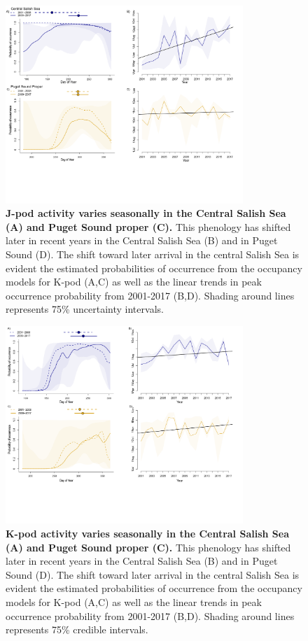 \documentclass{article}
\begin{document}
\begin{figure}[!hp]
\includegraphics[width=0.8\textwidth]{../analyses/figures/proboccJ_4panels.png} 
\caption{\textbf{J-pod activity varies seasonally in the Central Salish Sea (A) and Puget Sound proper (C).} This phenology has shifted later in recent years in the Central Salish Sea (B) and in Puget Sound (D). The shift toward later arrival in the central Salish Sea is evident the estimated probabilities of occurrence from the occupancy models for K-pod (A,C) as well as the linear trends in peak occurrence probability from 2001-2017 (B,D). Shading around lines represents 75\% uncertainty intervals. 
}
\label{fig:Jprobs}
\end{figure}

\begin{figure}[!hp]
\includegraphics[width=0.8\textwidth]{../analyses/figures/proboccK_4panels.png} 
\caption{\textbf{K-pod activity varies seasonally in the Central Salish Sea (A) and Puget Sound proper (C).} This phenology has shifted later in recent years in the Central Salish Sea (B) and in Puget Sound (D). The shift toward later arrival in the central Salish Sea is evident the estimated probabilities of occurrence from the occupancy models for K-pod (A,C) as well as the linear trends in peak occurrence probability from 2001-2017 (B,D). Shading around lines represents 75\% credible intervals. 
}
\label{fig:Kprobs}
\end{figure}
\end{document}

